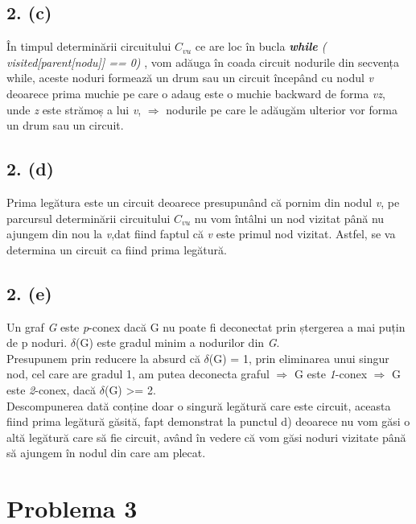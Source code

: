 \documentclass[12pt] {fphw}
\begin{document}
\subsection*{2. (c)}
În timpul determinării circuitului \textit{  ${}C_{vu}$} ce are loc în bucla \textit { \textbf{while} ( visited[parent[nodu]] == 0) }, vom adăuga în coada circuit nodurile din secvența while, aceste noduri formează un drum sau un circuit începând cu nodul  \textit{v} deoarece prima muchie pe care o adaug este o muchie  backward  de forma \textit{vz}, unde \textit{z } este strămoș a lui \textit{v},  $\Rightarrow$  nodurile pe care le adăugăm ulterior vor forma un drum sau un circuit. 
 
\subsection*{2. (d)}
Prima legătura este un circuit deoarece presupunând că pornim din nodul \textit{v}, pe parcursul determinării circuitului  \textit{  ${}C_{vu}$} nu vom întâlni un nod vizitat până nu ajungem din nou la \textit{v},dat fiind faptul că  \textit{v} este primul nod vizitat. Astfel, se va determina un circuit ca fiind prima legătură. 

\subsection*{2. (e)}
Un graf \textit{G} este \textit{p}-conex dacă G nu poate fi deconectat prin ștergerea a mai puțin de p noduri. $\delta$(G) este gradul minim a nodurilor din \textit{G}. \\
Presupunem prin reducere la absurd că  $\delta$(G) = 1, prin eliminarea unui singur nod, cel care are gradul 1, am putea deconecta graful  $\Rightarrow$ G este \textit{1}-conex $\Rightarrow$ G este \textit{2}-conex, dacă   $\delta$(G) >= 2. \\
Descompunerea dată conține doar o singură legătură care este circuit, aceasta fiind prima legătură găsită, fapt demonstrat la punctul d) deoarece nu vom găsi o altă legătură care să fie circuit, având în vedere că vom găsi noduri vizitate până să ajungem în nodul din care am plecat. 

\section*{Problema 3}
\end{document}
